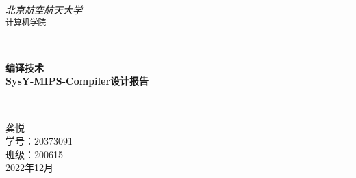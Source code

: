 \documentclass[fontset=fandol]{ctexrep}
\newcommand{\artdate}{2022年12月}
\begin{document}
 
 \begin{titlepage}
 
     \newcommand{\HRule}{\rule{\linewidth}{0.5mm}}
   
     \vfill
     \center 
     
     \textit{\Large 北京航空航天大学}\\[0.5cm] 
     \texttt{\Large 计算机学院}
   
     \vspace{3 cm}
     \HRule \\[0.4cm]
     { \huge \bfseries 编译技术}\\[0.4cm]
     { \huge \bfseries SysY-MIPS-Compiler设计报告}\\
     \HRule \\[1cm]
 
     \vspace{2.5 cm}
     龚悦\\
     学号：20373091\\
     班级：200615\\
 
     \vspace{1 cm}
     {\large \artdate}\\[3cm] 
   
   \vfill
   
 \end{titlepage}

 \tableofcontents
 
 
 
 
 
 
 
\end{document}

